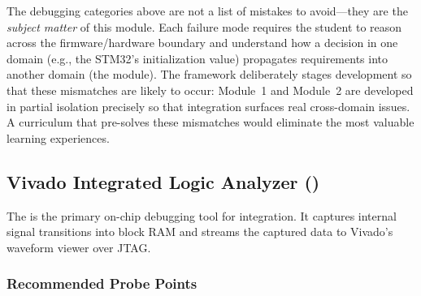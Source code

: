 \documentclass[11pt,letterpaper]{article}
\begin{document}
	\begin{tcolorbox}[infobox={Design Principle: Integration Failures Are Learning Objectives}]
		The debugging categories above are not a list of mistakes to avoid---they are the \emph{subject matter} of this module. Each failure mode requires the student to reason across the firmware/hardware boundary and understand how a decision in one domain (e.g., the STM32's \CRC{} initialization value) propagates requirements into another domain (the \VHDL{} \CRC{} module). The framework deliberately stages development so that these mismatches are likely to occur: Module~1 and Module~2 are developed in partial isolation precisely so that integration surfaces real cross-domain issues. A curriculum that pre-solves these mismatches would eliminate the most valuable learning experiences.
	\end{tcolorbox}

	\subsection{Vivado Integrated Logic Analyzer (\ILA{})}

	The \ILA{} is the primary on-chip debugging tool for \FPGA{} integration. It captures internal signal transitions into block RAM and streams the captured data to Vivado's waveform viewer over JTAG.

	\subsubsection{Recommended \ILA{} Probe Points}
\end{document}
